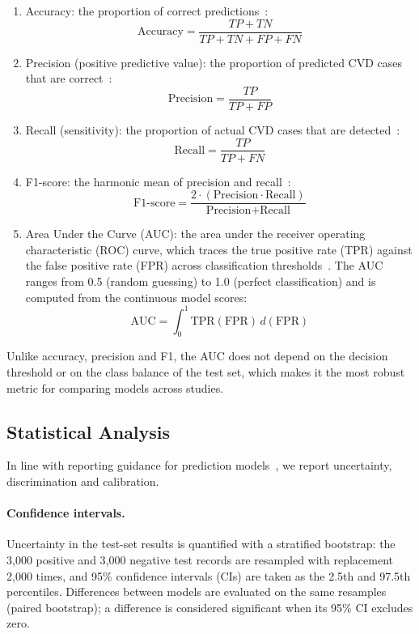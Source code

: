 \documentclass[11pt,a4paper]{article}
\begin{document}
\begin{enumerate}
\item Accuracy: the proportion of correct predictions~\cite{ullah2022}:
\begin{equation}
\text{Accuracy} = \frac{TP + TN}{TP + TN + FP + FN}
\end{equation}
\item Precision (positive predictive value): the proportion of predicted CVD
cases that are correct~\cite{ullah2023}:
\begin{equation}
\text{Precision} = \frac{TP}{TP + FP}
\end{equation}
\item Recall (sensitivity): the proportion of actual CVD cases that are
detected~\cite{ullah2023}:
\begin{equation}
\text{Recall} = \frac{TP}{TP + FN}
\end{equation}
\item F1-score: the harmonic mean of precision and recall~\cite{ullah2022}:
\begin{equation}
\text{F1-score} = \frac{2 \cdot (\text{Precision} \cdot \text{Recall})}{\text{Precision} + \text{Recall}}
\end{equation}
\item Area Under the Curve (AUC): the area under the receiver operating
characteristic (ROC) curve, which traces the true positive rate (TPR) against
the false positive rate (FPR) across classification
thresholds~\cite{ullah2022}. The AUC ranges from 0.5 (random guessing) to 1.0
(perfect classification) and is computed from the continuous model scores:
\begin{equation}
\text{AUC} = \int_0^1 \text{TPR}(\text{FPR})\, d(\text{FPR})
\end{equation}
\end{enumerate}

Unlike accuracy, precision and F1, the AUC does not depend on the decision
threshold or on the class balance of the test set, which makes it the most
robust metric for comparing models across studies.

\subsection{Statistical Analysis}
\label{sec:stats}

In line with reporting guidance for prediction models~\cite{collins2024},
we report uncertainty, discrimination and calibration.

\paragraph{Confidence intervals.} Uncertainty in the test-set results is
quantified with a stratified bootstrap: the 3,000 positive and 3,000
negative test records are resampled with replacement 2,000 times, and 95\%
confidence intervals (CIs) are taken as the 2.5th and 97.5th percentiles.
Differences between models are evaluated on the same resamples (paired
bootstrap); a difference is considered significant when its 95\% CI
excludes zero.
\end{document}
